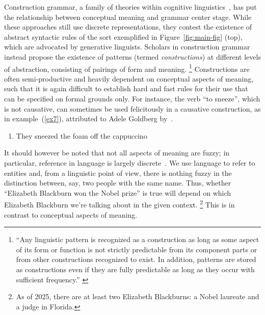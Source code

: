 Construction grammar, a family of theories within cognitive linguistics~\cite{Langacker1987,Lakoff1987,Fillmore1988,goldberg95,Croft2001}, has put the relationship between conceptual meaning and grammar center stage.
While these approaches still use discrete representations, they contest the existence of abstract syntactic rules of the sort exemplified in Figure~\ref{fig:main-fig} (top), which are advocated by generative linguists.
Scholars in construction grammar instead propose the existence of patterns (termed \textit{constructions}) at different levels of abstraction, consisting of pairings of form and meaning.
\footnote{``Any linguistic pattern is recognized as a construction as long as some aspect of its form
or function is not strictly predictable from its component parts or from other
constructions recognized to exist. In addition, patterns are stored as constructions even if
they are fully predictable as long as they occur with sufficient frequency.'' \cite[][p. 5]{goldberg05}}
Constructions are often semi-productive and heavily dependent on conceptual aspects of meaning, such that it is again difficult to establish hard and fast rules for their use that can be specified on formal grounds only.
For instance, the verb ``to sneeze'', which is not causative, can sometimes be used felicitously in a causative construction, as in example~(\ref{ex7}), attributed to Adele Goldberg by~\citet{hill2024transformersobviouslygoodmodels}.

\renewcommand{\labelenumi}{(\theenumi)}
\begin{enumerate}[resume]
\item \label{ex7} They sneezed the foam off the cappuccino
\end{enumerate}

It should however be noted that not all aspects of meaning are fuzzy; in particular, reference in language is largely discrete~\cite{frege1892}.
We use language to refer to entities and, from a linguistic point of view, there is nothing fuzzy in the distinction between, say, two people with the same name. Thus, whether ``Elizabeth Blackburn won the Nobel prize'' is true will depend on which Elizabeth Blackburn we're talking about in the given context.
\footnote{As of 2025, there are at least two Elizabeth Blackburns: a Nobel laureate and a judge in Florida.}
This is in contrast to conceptual aspects of meaning.

